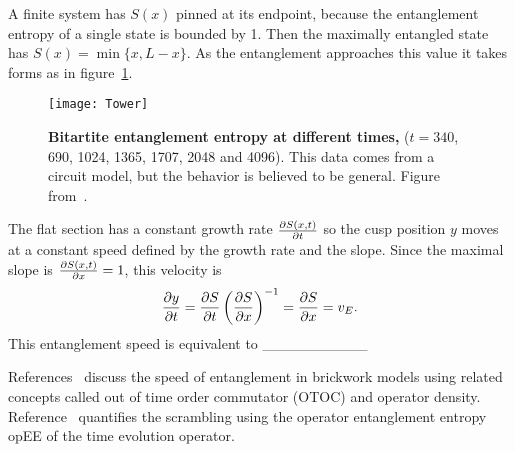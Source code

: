A finite system has $S(x)$ pinned at its endpoint, because the entanglement entropy of a single state is bounded by 1. Then the maximally entangled state has $S(x) = \min\{x,L-x\}$. As the entanglement approaches this value it takes forms as in figure~\ref{fig:Tower}.
\begin{figure}
	\centering
	\texttt{[image: Tower]}
	\caption{\textbf{Bitartite entanglement entropy at different times,} ($t = 340$, 690, 1024, 1365, 1707, 2048 and 4096). This data comes from a circuit model, but the behavior is believed to be general. Figure from~\cite{Nahum2017}.}
	\label{fig:Tower}
\end{figure}
The flat section has a constant growth rate $\frac{\partial S(x,t)}{\partial t}$ so the cusp position $y$ moves at a constant speed defined by the growth rate and the slope. Since the maximal slope is $\frac{\partial S(x,t)}{\partial x}=1$, this velocity is
\begin{align}
\frac{\partial y}{\partial t} = \frac{\partial S}{\partial t}\left(\frac{\partial S}{\partial x}\right)^{-1} = \frac{\partial S}{\partial x} = v_E.
\end{align}
This entanglement speed is equivalent to \_\_\_\_\_\_\_\_\_\_

References~\cite{Keyserlingk, Jonay, Nahum2017} discuss the speed of entanglement in brickwork models using related concepts called out of time order commutator (OTOC) and operator density. Reference~\cite{Zhou2017} quantifies the scrambling using the operator entanglement entropy opEE of the time evolution operator.
